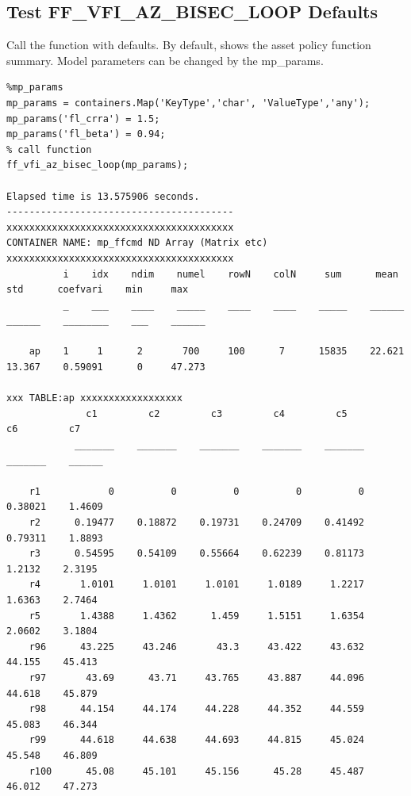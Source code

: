 \documentclass[
]{book}
\begin{document}
\hypertarget{test-ff_vfi_az_bisec_loop-defaults}{%
\subsection{Test FF\_VFI\_AZ\_BISEC\_LOOP Defaults}\label{test-ff_vfi_az_bisec_loop-defaults}}

Call the function with defaults. By default, shows the asset policy
function summary. Model parameters can be changed by the mp\_params.

\begin{verbatim}
%mp_params
mp_params = containers.Map('KeyType','char', 'ValueType','any');
mp_params('fl_crra') = 1.5;
mp_params('fl_beta') = 0.94;
% call function
ff_vfi_az_bisec_loop(mp_params);

Elapsed time is 13.575906 seconds.
----------------------------------------
xxxxxxxxxxxxxxxxxxxxxxxxxxxxxxxxxxxxxxxx
CONTAINER NAME: mp_ffcmd ND Array (Matrix etc)
xxxxxxxxxxxxxxxxxxxxxxxxxxxxxxxxxxxxxxxx
          i    idx    ndim    numel    rowN    colN     sum      mean      std      coefvari    min     max  
          _    ___    ____    _____    ____    ____    _____    ______    ______    ________    ___    ______

    ap    1     1      2       700     100      7      15835    22.621    13.367    0.59091      0     47.273

xxx TABLE:ap xxxxxxxxxxxxxxxxxx
              c1         c2         c3         c4         c5         c6         c7  
            _______    _______    _______    _______    _______    _______    ______

    r1            0          0          0          0          0    0.38021    1.4609
    r2      0.19477    0.18872    0.19731    0.24709    0.41492    0.79311    1.8893
    r3      0.54595    0.54109    0.55664    0.62239    0.81173     1.2132    2.3195
    r4       1.0101     1.0101     1.0101     1.0189     1.2217     1.6363    2.7464
    r5       1.4388     1.4362      1.459     1.5151     1.6354     2.0602    3.1804
    r96      43.225     43.246       43.3     43.422     43.632     44.155    45.413
    r97       43.69      43.71     43.765     43.887     44.096     44.618    45.879
    r98      44.154     44.174     44.228     44.352     44.559     45.083    46.344
    r99      44.618     44.638     44.693     44.815     45.024     45.548    46.809
    r100      45.08     45.101     45.156      45.28     45.487     46.012    47.273
\end{verbatim}
\end{document}
